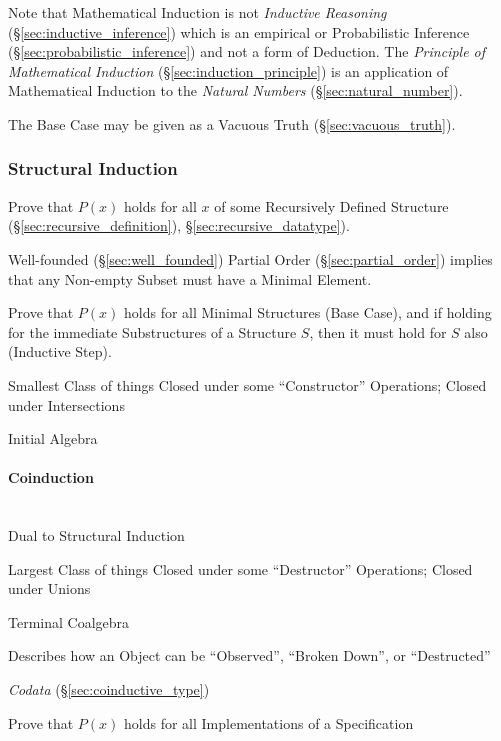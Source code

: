 Note that Mathematical Induction is not \emph{Inductive Reasoning}
(\S\ref{sec:inductive_inference}) which is an empirical or
Probabilistic Inference (\S\ref{sec:probabilistic_inference}) and not
a form of Deduction. The \emph{Principle of Mathematical Induction}
(\S\ref{sec:induction_principle}) is an application of Mathematical
Induction to the \emph{Natural Numbers} (\S\ref{sec:natural_number}).

The Base Case may be given as a Vacuous Truth
(\S\ref{sec:vacuous_truth}).



\subsubsection{Structural Induction}\label{sec:structural_induction}

Prove that $P(x)$ holds for all $x$ of some Recursively Defined
Structure (\S\ref{sec:recursive_definition}),
\S\ref{sec:recursive_datatype}).

Well-founded (\S\ref{sec:well_founded}) Partial Order
(\S\ref{sec:partial_order}) implies that any Non-empty Subset must
have a Minimal Element.

Prove that $P(x)$ holds for all Minimal Structures (Base Case), and if
holding for the immediate Substructures of a Structure $S$, then it
must hold for $S$ also (Inductive Step). %

Smallest Class of things Closed under some ``Constructor'' Operations;
Closed under Intersections \cite{shulman11}

Initial Algebra %



\paragraph{Coinduction}\label{sec:coinduction}
\hfill \\

Dual to Structural Induction

Largest Class of things Closed under some ``Destructor'' Operations;
Closed under Unions \cite{shulman11}

Terminal Coalgebra %

Describes how an Object can be ``Observed'', ``Broken Down'', or
``Destructed''

\emph{Codata} (\S\ref{sec:coinductive_type})

Prove that $P(x)$ holds for all Implementations of a Specification



